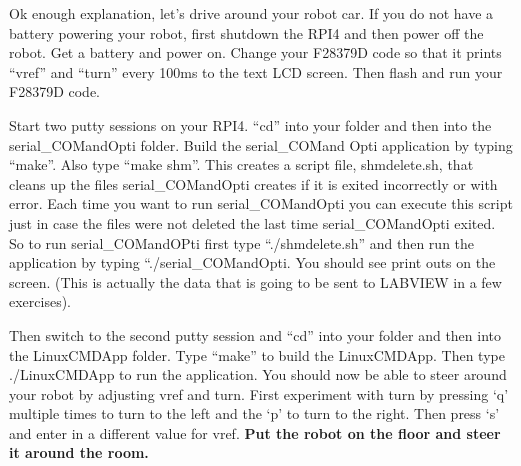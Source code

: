 \documentclass[11pt]{article}
\begin{document}
    Ok enough explanation, let’s drive around your robot car. If you do not have a battery powering your robot, first shutdown the RPI4 and then power off the robot. Get a battery and power on. Change your F28379D code so that it prints “vref” and “turn” every 100ms to the text LCD screen. Then flash and run your F28379D code.

    Start two putty sessions on your RPI4. “cd” into your folder and then into the serial\_COMandOpti folder. Build the serial\_COMand Opti application by typing “make”. Also type “make shm”. This creates a script file, shmdelete.sh, that cleans up the files serial\_COMandOpti creates if it is exited incorrectly or with error. Each time you want to run serial\_COMandOpti you can execute this script just in case the files were not deleted the last time serial\_COMandOpti exited. So to run serial\_COMandOPti first type “./shmdelete.sh” and then run the application by typing “./serial\_COMandOpti. You should see print outs on the screen. (This is actually the data that is going to be sent to LABVIEW in a few exercises).

    Then switch to the second putty session and “cd” into your folder and then into the LinuxCMDApp folder. Type “make” to build the LinuxCMDApp. Then type ./LinuxCMDApp to run the application. You should now be able to steer around your robot by adjusting vref and turn. First experiment with turn by pressing ‘q’ multiple times to turn to the left and the ‘p’ to turn to the right. Then press ‘s’ and enter in a different value for vref. \textbf{Put the robot on the floor and steer it around the room.}
\end{document}
